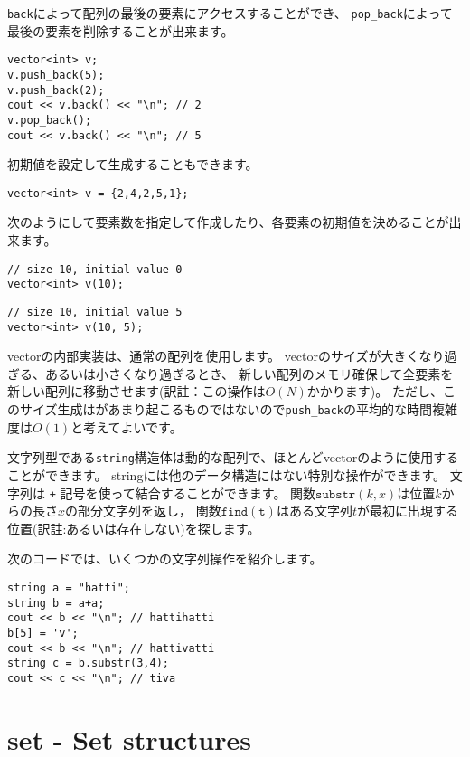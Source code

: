 \texttt{back}によって配列の最後の要素にアクセスすることができ、
\texttt{pop\_back}によって最後の要素を削除することが出来ます。
\begin{lstlisting}
vector<int> v;
v.push_back(5);
v.push_back(2);
cout << v.back() << "\n"; // 2
v.pop_back();
cout << v.back() << "\n"; // 5
\end{lstlisting}

初期値を設定して生成することもできます。
\begin{lstlisting}
vector<int> v = {2,4,2,5,1};
\end{lstlisting}

次のようにして要素数を指定して作成したり、各要素の初期値を決めることが出来ます。
\begin{lstlisting}
// size 10, initial value 0
vector<int> v(10);
\end{lstlisting}
\begin{lstlisting}
// size 10, initial value 5
vector<int> v(10, 5);
\end{lstlisting}

vectorの内部実装は、通常の配列を使用します。
vectorのサイズが大きくなり過ぎる、あるいは小さくなり過ぎるとき、
新しい配列のメモリ確保して全要素を新しい配列に移動させます(訳註：この操作は$O(N)$かかります)。
ただし、このサイズ生成はがあまり起こるものではないので\texttt{push\_back}の平均的な時間複雑度は$O(1)$と考えてよいです。


文字列型である\texttt{string}構造体は動的な配列で、ほとんどvectorのように使用することができます。
stringには他のデータ構造にはない特別な操作ができます。
文字列は \texttt{+} 記号を使って結合することができます。
関数$\texttt{substr}(k,x)$は位置$k$からの長さ$x$の部分文字列を返し，
関数$\texttt{find}(\texttt{t})$はある文字列$t$が最初に出現する位置(訳註:あるいは存在しない)を探します。

次のコードでは、いくつかの文字列操作を紹介します。

\begin{lstlisting}
string a = "hatti";
string b = a+a;
cout << b << "\n"; // hattihatti
b[5] = 'v';
cout << b << "\n"; // hattivatti
string c = b.substr(3,4);
cout << c << "\n"; // tiva
\end{lstlisting}

\section{set - Set structures}



